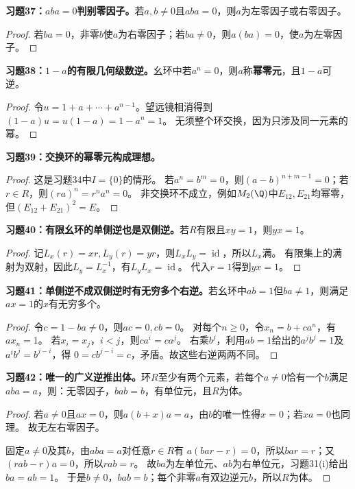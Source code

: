\begin{problem}
\textbf{习题37：$aba=0$判别零因子。}若$a,b\neq0$且$aba=0$，则$a$为左零因子或右零因子。
\end{problem}
\begin{proof}
若$ba=0$，非零$b$使$a$为右零因子；若$ba\neq0$，则$a(ba)=0$，使$a$为左零因子。
\end{proof}

\begin{problem}
\textbf{习题38：$1-a$的有限几何级数逆。}幺环中若$a^n=0$，则$a$称\textbf{幂零元}，且$1-a$可逆。
\end{problem}
\begin{proof}
令$u=1+a+\cdots+a^{n-1}$。望远镜相消得到$(1-a)u=u(1-a)=1-a^n=1$。
无须整个环交换，因为只涉及同一元素的幂。
\end{proof}

\begin{problem}
\textbf{习题39：交换环的幂零元构成理想。}
\end{problem}
\begin{proof}
这是习题34中$I=\{0\}$的情形。
若$a^n=b^m=0$，则$(a-b)^{n+m-1}=0$；若$r\in R$，则$(ra)^n=r^na^n=0$。
非交换环不成立，例如$M_2(\Q)$中$E_{12},E_{21}$均幂零，但$(E_{12}+E_{21})^2=E$。
\end{proof}

\begin{problem}
\textbf{习题40：有限幺环的单侧逆也是双侧逆。}若$R$有限且$xy=1$，则$yx=1$。
\end{problem}
\begin{proof}
记$L_x(r)=xr,L_y(r)=yr$，则$L_xL_y=\operatorname{id}$，所以$L_x$满。
有限集上的满射为双射，因此$L_y=L_x^{-1}$，有$L_yL_x=\operatorname{id}$。
代入$r=1$得到$yx=1$。
\end{proof}

\begin{problem}
\textbf{习题41：单侧逆不成双侧逆时有无穷多个右逆。}若幺环中$ab=1$但$ba\neq1$，则满足$ax=1$的$x$有无穷多个。
\end{problem}
\begin{proof}
令$c=1-ba\neq0$，则$ac=0,cb=0$。
对每个$n\geq0$，令$x_n=b+ca^n$，有$ax_n=1$。
若$x_i=x_j$，$i<j$，则$ca^i=ca^j$。
右乘$b^j$，利用$ab=1$给出的$a^jb^j=1$及$a^ib^j=b^{j-i}$，得
$0=cb^{j-i}=c$，矛盾。故这些右逆两两不同。
\end{proof}

\begin{problem}
\textbf{习题42：唯一的广义逆推出体。}环$R$至少有两个元素，若每个$a\neq0$恰有一个$b$满足$aba=a$，则：无零因子，$bab=b$，有单位元，且$R$为体。
\end{problem}
\begin{proof}
若$a\neq0$且$ax=0$，则$a(b+x)a=a$，由$b$的唯一性得$x=0$；若$xa=0$也同理。
故无左右零因子。

固定$a\neq0$及其$b$，由$aba=a$对任意$r\in R$有
$a(bar-r)=0$，所以$bar=r$；又$(rab-r)a=0$，所以$rab=r$。
故$ba$为左单位元、$ab$为右单位元，习题31(i)给出$ba=ab=1$。
于是$b\neq0$，$bab=b$；每个非零$a$有双边逆元$b$，所以$R$为体。
\end{proof}

